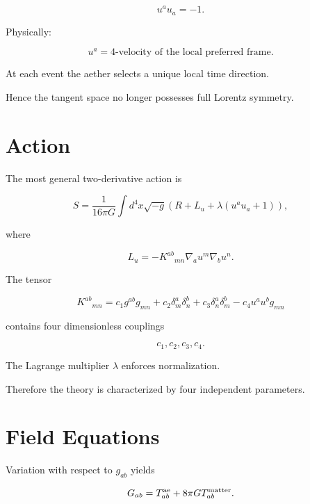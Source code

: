 \begin{equation}
u^a u_a=-1.
\end{equation}

Physically:

\begin{equation}
u^a=
\text{4-velocity of the local preferred frame}.
\end{equation}

At each event the aether selects a unique local time direction.

Hence the tangent space no longer possesses full Lorentz symmetry.

\section{Action}

The most general two-derivative action is

\begin{equation}
S=
\frac{1}{16\pi G}
\int d^4x
\sqrt{-g}
\left(
R + L_u
+\lambda(u^a u_a+1)
\right),
\end{equation}

where

\begin{equation}
L_u=
-K^{ab}{}_{mn}
\nabla_a u^m
\nabla_b u^n .
\end{equation}

The tensor

\begin{equation}
K^{ab}{}_{mn}
=
c_1 g^{ab}g_{mn}
+c_2 \delta^a_m\delta^b_n
+c_3 \delta^a_n\delta^b_m
-c_4 u^a u^b g_{mn}
\end{equation}

contains four dimensionless couplings

\begin{equation}
c_1,c_2,c_3,c_4.
\end{equation}

The Lagrange multiplier $\lambda$
enforces normalization.

Therefore the theory is characterized by four independent parameters.

\section{Field Equations}

Variation with respect to $g_{ab}$ yields

\begin{equation}
G_{ab}
=
T^{\rm ae}_{ab}
+
8\pi G T^{\rm matter}_{ab}.
\end{equation}

